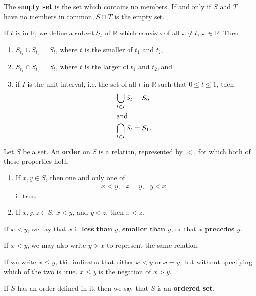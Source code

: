 \documentclass[12pt]{article}
\begin{document}
\begin{defn}
  The \textbf{empty set} is the set which contains no members. If and only if $S$ and
  $T$ have no members in common, $S \cap T$ is the empty set.
\end{defn}

\begin{exm}
  If $t$ is in $\mathbb{R}$, we define a subset $S_t$ of $\mathbb{R}$ which consists
  of all $x \nless t,\ x \in \mathbb{R}$. Then
  \begin{enumerate}
    \item
      $S_{t_1} \cup S_{t_2} = S_t$, where $t$ is the smaller of $t_1$ and $t_2$,
    \item
      $S_{t_1} \cap S_{t_2} = S_t$, where $t$ is the larger of $t_1$ and $t_2$, and
    \item
      if $I$ is the unit interval, i.e. the set of all $t$ in $\mathbb{R}$ such that
      $0 \leq t \leq 1$, then
      \begin{align*}
        \bigcup_{t \in I}S_t &= S_0\\
        \shortintertext{and}
        \bigcap_{t \in I}S_t &= S_1.
      \end{align*}
  \end{enumerate}
\end{exm}

\begin{defn}
  Let $S$ be a set. An \textbf{order} on $S$ is a relation, represented by $<$, for
  which both of these properties hold.
  \begin{enumerate}
    \item
      If $x,y \in S$, then one and only one of
      \begin{align*}
        x < y,\ \ \ x = y,\ \ \ y < x
      \end{align*}
      is true.
    \item
      If $x,y,z \in S$, $x < y$, and $y < z$, then $x < z$.
  \end{enumerate}

  If $x < y$, we say that $x$ is \textbf{less than} $y$, \textbf{smaller than} $y$,
  or that $x$ \textbf{precedes} $y$.

  If $x < y$, we may also write $y > x$ to represent the same relation.

  If we write $x \leq y$, this indicates that either $x < y$ or $x = y$, but without
  specifying which of the two is true. $x \leq y$ is the negation of $x > y$.

  If $S$ has an order defined in it, then we say that $S$ is an \textbf{ordered set}.
\end{defn}
\end{document}
